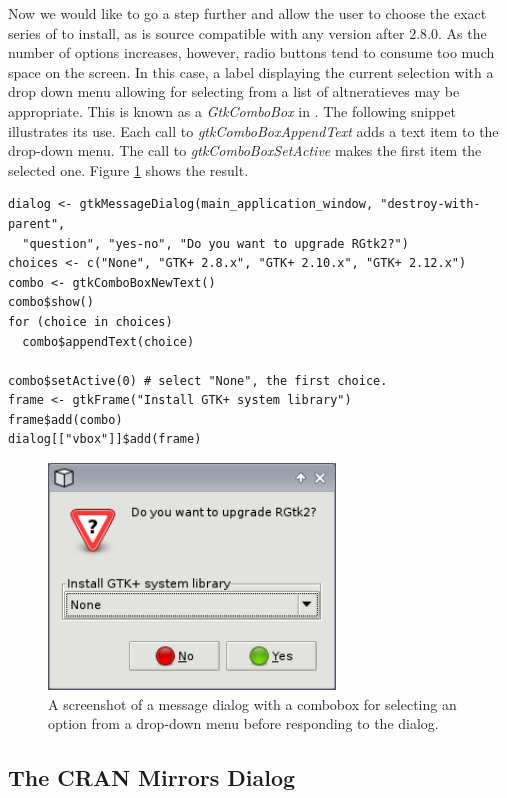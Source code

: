 \documentclass[article]{jss}
\begin{document}
Now we would like to go a step further and allow the user to choose
the exact series of  to install, as  is source
compatible with any version after $2.8.0$. As the number of options
increases, however, radio buttons tend to consume too much space on
the screen. In
this case, a label displaying the current selection with a drop down
menu allowing for selecting from a list of altneratieves may be
appropriate.  This is known as a \emph{GtkComboBox} in . The
following snippet illustrates its use. Each call to
\emph{gtkComboBoxAppendText} adds a text item to the drop-down
menu. The call to \emph{gtkComboBoxSetActive} makes the first item the
selected one. Figure \ref{fig:combo-dialog} shows the result.
\begin{verbatim}
dialog <- gtkMessageDialog(main_application_window, "destroy-with-parent", 
  "question", "yes-no", "Do you want to upgrade RGtk2?")
choices <- c("None", "GTK+ 2.8.x", "GTK+ 2.10.x", "GTK+ 2.12.x")
combo <- gtkComboBoxNewText()
combo$show()
for (choice in choices) 
  combo$appendText(choice)

combo$setActive(0) # select "None", the first choice.
frame <- gtkFrame("Install GTK+ system library")
frame$add(combo)
dialog[["vbox"]]$add(frame)
\end{verbatim}

\begin{figure}
\begin{center}
\includegraphics[width=3in]{combo-dialog.png}
\caption{\label{fig:combo-dialog}A screenshot of a message dialog with a 
combobox for selecting an option from a drop-down menu before responding to
the dialog.}
\end{center}
\end{figure}

\subsection{The CRAN Mirrors Dialog}
\end{document}
